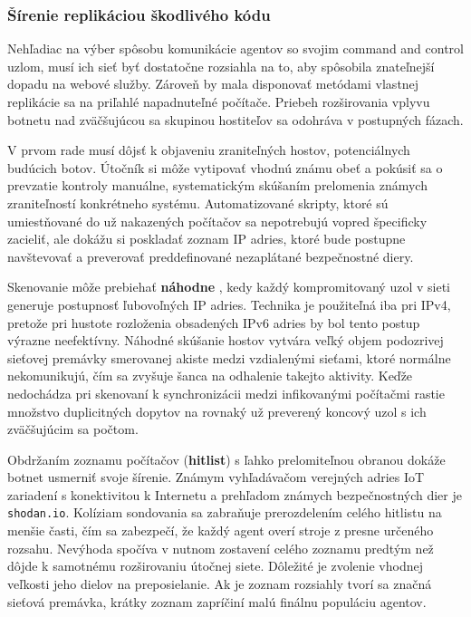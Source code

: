 \documentclass[12pt, a4paper]{article}
\begin{document}
\subsubsection{Šírenie replikáciou škodlivého kódu}
Nehľadiac na výber spôsobu komunikácie agentov so svojim command and control uzlom, musí ich sieť byť 
dostatočne rozsiahla na to, aby spôsobila znateľnejší dopadu na webové služby. Zároveň by mala disponovať 
metódami vlastnej replikácie sa na priľahlé napadnuteľné počítače. Priebeh rozširovania vplyvu botnetu
nad zväčšujúcou sa skupinou hostiteľov sa odohráva v postupných fázach. 

V prvom rade musí dôjsť k objaveniu zraniteľných hostov, potenciálnych budúcich botov. Útočník si
môže vytipovať vhodnú známu obeť a pokúsiť sa o prevzatie kontroly manuálne, systematickým skúšaním
prelomenia známych zraniteľností konkrétneho systému. Automatizované skripty, ktoré sú umiestňované do už 
nakazených počítačov sa nepotrebujú vopred špecificky zacieliť, ale dokážu si poskladať zoznam IP adries, 
ktoré bude postupne navštevovať a preverovať preddefinované nezaplátané bezpečnostné diery. 

Skenovanie môže prebiehať \textbf{náhodne} \cite{ddos-anatomy-2004}, kedy každý kompromitovaný uzol v sieti 
generuje postupnosť ľubovoľných IP adries. Technika je použiteľná iba pri IPv4, pretože pri hustote 
rozloženia obsadených IPv6 adries by bol tento postup výrazne neefektívny. Náhodné skúšanie hostov
vytvára veľký objem podozrivej sieťovej premávky smerovanej akiste medzi vzdialenými sieťami, 
ktoré normálne nekomunikujú, čím sa zvyšuje šanca na odhalenie takejto aktivity. Keďže nedochádza 
pri skenovaní k synchronizácii medzi infikovanými počítačmi rastie množstvo duplicitných dopytov
na rovnaký už preverený koncový uzol s ich zväčšujúcim sa počtom.

Obdržaním zoznamu počítačov (\textbf{hitlist}) s ľahko prelomiteľnou obranou dokáže botnet usmerniť svoje 
šírenie. Známym vyhľadávačom verejných adries IoT zariadení s konektivitou k Internetu a prehľadom
známych bezpečnostných dier je \verb|shodan.io|. Kolíziam sondovania sa zabraňuje prerozdelením celého 
hitlistu na menšie časti, čím sa zabezpečí, že každý agent overí stroje z presne určeného rozsahu. Nevýhoda 
spočíva v nutnom zostavení celého zoznamu predtým než dôjde k samotnému rozširovaniu útočnej siete. Dôležité 
je zvolenie vhodnej veľkosti jeho dielov na preposielanie. Ak je zoznam rozsiahly tvorí sa značná sieťová 
premávka, krátky zoznam zapríčiní malú finálnu populáciu agentov. 
\end{document}
